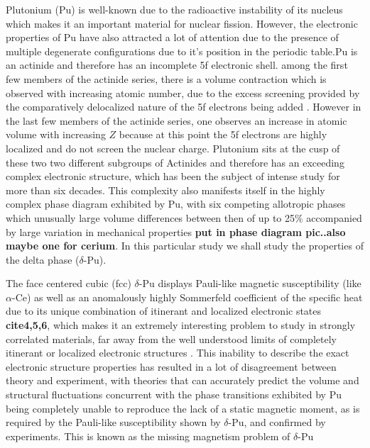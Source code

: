 \documentclass[10pt]{ruthesis}
\begin{document}
{Plutonium (Pu) is well-known due to the radioactive instability of its nucleus which makes it an important material for nuclear fission. However, the electronic properties of Pu have also attracted a lot of attention due to the presence of multiple degenerate configurations due to it's position in the periodic table.Pu is an actinide and therefore has an incomplete 5f electronic shell.  among the first few members of the actinide series, there is a volume contraction which is observed with increasing atomic number, due to the excess screening provided by the comparatively delocalized nature of the 5f electrons being added . However in the last few members of the actinide series, one observes an increase in atomic volume with increasing $Z$ because at this point the 5f electrons are highly localized and do not screen the nuclear charge. Plutonium sits at the cusp of these two two different subgroups of Actinides and therefore has an exceeding complex electronic structure, which has been the subject of intense study for more than six decades. This complexity also manifests itself in the highly complex phase diagram exhibited by Pu, with six competing allotropic phases which unusually large volume differences between then of up to 25$\%$ accompanied by large variation in mechanical properties \textbf{put in phase diagram pic..also maybe one for cerium}. In this particular study we shall study the properties of the delta phase ($\delta$-Pu). 

The face centered cubic (fcc) $\delta$-Pu displays Pauli-like magnetic susceptibility (like $\alpha$-Ce)  as well as an anomalously highly  Sommerfeld coefficient of the specific heat  due to its unique combination of itinerant and localized electronic states  \textbf{cite{4,5,6}}, which makes it an extremely interesting problem to study in strongly correlated materials, far away from the well understood limits of completely itinerant or localized electronic structures . This inability to describe the exact electronic structure properties has resulted in a lot of disagreement between theory and experiment, with theories that can accurately predict the volume and structural fluctuations concurrent with the phase transitions exhibited by Pu being completely unable to reproduce the lack of a static magnetic moment, as is required by the Pauli-like susceptibility shown by $\delta$-Pu, and confirmed by experiments. This is known as the missing magnetism problem of $\delta$-Pu

}
\end{document}
